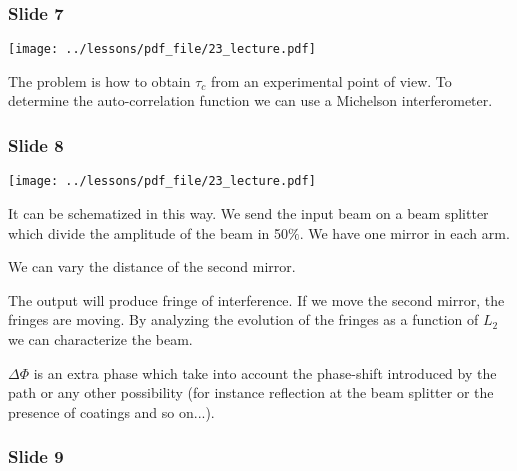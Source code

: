 \documentclass[../main/main.tex]{subfiles}
\begin{document}
\newpage

\subsubsection*{Slide 7}

\begin{minipage}[]{0.5\linewidth}
\centering
\texttt{[image: ../lessons/pdf\_file/23\_lecture.pdf]}
\end{minipage}
\hspace{0.3cm}\vspace{0.3cm}
\begin{minipage}[c]{0.47\linewidth}

The problem is how to obtain \( \tau _c \) from an experimental point of view. To determine the auto-correlation function we can use a Michelson interferometer.

\end{minipage}

\subsubsection*{Slide 8}

\begin{minipage}[]{0.5\linewidth}
\centering
\texttt{[image: ../lessons/pdf\_file/23\_lecture.pdf]}
\end{minipage}
\hspace{0.3cm}\vspace{0.3cm}
\begin{minipage}[c]{0.47\linewidth}

It can be schematized in this way. We send the input beam on a beam splitter which divide the amplitude of the beam in 50$\%$. We have one mirror in each arm.

We can vary the distance of the second mirror.

The output will produce fringe of interference. If we move the second mirror, the fringes are moving. By analyzing the evolution of the fringes as a function of \( L_2 \) we can characterize the beam.

\( \Delta \Phi  \) is an extra phase which take into account the phase-shift introduced by the path or any other possibility (for instance reflection at the beam splitter or the presence of coatings and so on...).

\end{minipage}

\subsubsection*{Slide 9}
\end{document}
